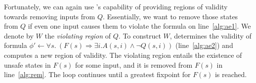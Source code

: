 Fortunately, we can again use \aeval's capability of providing regions of validity
towards removing inputs from $Q$.  Essentially, we want to remove those states from $Q$ if even one input causes them to violate the formula on line~\ref{alg:ae1}.  We denote by $W$ the {\em violating region} of $Q$.  To construct $W$, \aeval  determines
the validity of formula $\phi' \gets \forall s. \ (F(s) \Rightarrow \exists
i. A(s,i) \land \lnot Q(s,i))$ (line~\ref{alg:ae2}) and computes
a new region of validity.
The violating region entails
the existence of unsafe states in $F(s)$ for some input, and it is removed from $F(s)$ in line~\ref{alg:rem}.   The loop continues until a greatest fixpoint for $F(s)$ is reached.  %






